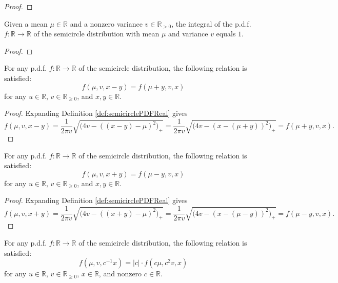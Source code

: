\begin{proof}
\end{proof}
\begin{lemma}\label{lem:integral_semicirclePDFReal_eq_one}
    \notready
    Given a mean $\mu \in \mathbb{R}$ and a nonzero variance $v \in \mathbb{R}_{> 0}$, the integral of the p.d.f. $f : \mathbb{R} \rightarrow \mathbb{R}$ 
    of the semicircle distribution with mean $\mu$ and variance $v$ equals $1$.
\end{lemma}
\begin{proof}
\end{proof}
\begin{lemma}\label{lem:semicirclePDFReal_sub}
    \mathlibok
    For any p.d.f. $f : \mathbb{R} \rightarrow \mathbb{R}$ 
    of the semicircle distribution, the following relation is satisfied:
    \[
    f(\mu,v,x-y) = f(\mu+y,v,x)
    \]
    for any $u \in \mathbb{R}$, $v \in \mathbb{R}_{\geq 0}$, and $x,y \in \mathbb{R}$. 
\end{lemma}
\begin{proof}
   Expanding Definition \ref{def:semicirclePDFReal} gives
   \[
   f(\mu,v,x-y) 
   = \frac{1}{2πv} \sqrt{\bigl( 4v - ( (x - y) - μ)^2 \bigl)_+} 
   = \frac{1}{2πv} \sqrt{\bigl( 4v - (x - (μ + y))^2 \bigl)_+}
   = f(\mu+y,v,x).
   \]
\end{proof}
\begin{lemma}\label{lem:semicirclePDFReal_add}
    \mathlibok
    For any p.d.f. $f : \mathbb{R} \rightarrow \mathbb{R}$ 
    of the semicircle distribution, the following relation is satisfied:
    \[
    f(\mu,v,x+y) = f(\mu-y,v,x)
    \]
    for any $u \in \mathbb{R}$, $v \in \mathbb{R}_{\geq 0}$, and $x,y \in \mathbb{R}$. 
\end{lemma}
\begin{proof}
   Expanding Definition \ref{def:semicirclePDFReal} gives
   \[
   f(\mu,v,x+y) 
   = \frac{1}{2πv} \sqrt{\bigl( 4v - ( (x + y) - μ)^2 \bigl)_+} 
   = \frac{1}{2πv} \sqrt{\bigl( 4v - (x - (μ - y))^2 \bigl)_+}
   = f(\mu-y,v,x).
   \]
\end{proof}
\begin{lemma}\label{lem:semicirclePDFReal_inv_mul}
    \notready
    For any p.d.f. $f : \mathbb{R} \rightarrow \mathbb{R}$ 
    of the semicircle distribution, the following relation is satisfied:
    \[
    f(\mu,v,c^{-1} x) = |c| \cdot f(c \mu,c^2 v,x)
    \]
    for any $u \in \mathbb{R}$, $v \in \mathbb{R}_{\geq 0}$, $x \in \mathbb{R}$, and nonzero $c \in \mathbb{R}$. 
\end{lemma}
